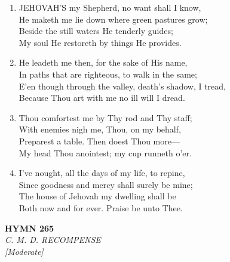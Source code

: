 \begin{enumerate}
    \item JEHOVAH'S my Shepherd, no want shall I know, \\
        He maketh me lie down where green pastures grow; \\
        Beside the still waters He tenderly guides; \\
        My soul He restoreth by things He provides.

    \item He leadeth me then, for the sake of His name, \\
        In paths that are righteous, to walk in the same; \\
        E'en though through the valley, death's shadow, I tread, \\
        Because Thou art with me no ill will I dread.

    \item Thou comfortest me by Thy rod and Thy staff; \\
        With enemies nigh me, Thou, on my behalf, \\
        Preparest a table. Then doest Thou more--- \\
        My head Thou anointest; my cup runneth o'er.

    \item I've nought, all the days of my life, to repine, \\
        Since goodness and mercy shall surely be mine; \\
        The house of Jehovah my dwelling shall be \\
        Both now and for ever. Praise be unto Thee.

\end{enumerate}

\newpage
\begin{center}
    {\Large \textbf{HYMN 265}}
    \\
    \textit{C. M. D. RECOMPENSE}
    \\
    \textit{\small [Moderate]}
\end{center}
\vspace{1em}

